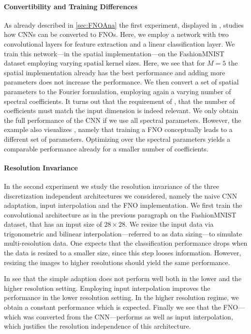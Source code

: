 \paragraph{Convertibility and Training Differences} As already described in \cref{sec:FNOAna} the first experiment, displayed in \cite[Fig. 3]{kabri2023resolution}, studies how CNNs can be converted to FNOs. Here, we employ a network with two convolutional layers for feature extraction and a linear classification layer. We train this network---in the spatial implementation---on the FashionMNIST dataset employing varying spatial kernel sizes. Here, we see that for $M=5$ the spatial implementation already has the best performance and adding more parameters does not increase the performance. We then convert a set of spatial parameters to the Fourier formulation, employing again a varying number of spectral coefficients. It turns out that the requirement of \cite[Lem. 3]{kabri2023resolution}, that the number of coefficients must match the input dimension is indeed relevant. We only obtain the full performance of the CNN if we use all spectral parameters. However, the example also visualizes \cite[Lem. 4]{kabri2023resolution}, namely that training a FNO conceptually leads to a different set of parameters. Optimizing over the spectral parameters yields a comparable performance already for a smaller number of coefficients.
%
%
\paragraph{Resolution Invariance}
%
In the second experiment we study the resolution invariance of the three discretization independent architectures we considered, namely the naive CNN adaptation, input interpolation and the FNO implementation. We first train the convolutional architecture as in the previous paragraph on the FashionMNIST dataset, that has an input size of $28\times 28$. We resize the input data via trigonometric and bilinear interpolation---referred to as data sizing---to simulate multi-resolution data. One expects that the classification performance drops when the data is resized to a smaller size, since this step looses information. However, resizing the images to higher resolutions should yield the same performance.

In \cite[Fig. 4]{kabri2023resolution} see that the simple adaption does not perform well both in the lower and the higher resolution setting. Employing input interpolation improves the performance in the lower resolution setting. In the higher resolution regime, we obtain a constant performance which is expected. Finally we see that the FNO---which was converted from the CNN---performs as well as input interpolation, which justifies the resolution independence of this architecture.

